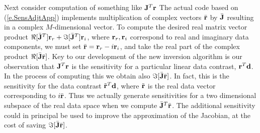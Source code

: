 Next consider computation of something like ${\bf J}^T {\bf r}$
The actual code based on (\ref{e.SensAdjtApp})
implements multiplication of complex vectors
$\bar {{\bf r}}$ by $\bar {{\bf J}}$ resulting in
a complex $M$-dimensional vector.
To compute the desired real matrix vector product
$\Re [\bar {{\bf J}}^T] {\bf r}_r + \Im [\bar {{\bf J}}^T] {\bf r}_i$, where
${\bf r}_r, {\bf r}_i$ correspond to real and imaginary data components,
we must set $\bar {{\bf r}} = {\bf r}_r - i {\bf r}_i$,
and take the real part of the complex product $\Re [\bar {{\bf J}} \bar {{\bf r}}]$.
Key to our development of the new inversion algorithm is our
observation that ${\bf J}^T {\bf r}$ is the sensitivity for a particular
linear data contrast, ${\bf r}^T{\bf d}$.  In the process of computing
this we obtain also $\Im [\bar {{\bf J}} \bar {{\bf r}}]$. In fact, this is
the sensitivity for the data contrast  $\tilde {{\bf r}}^T{\bf d}$,
where $\tilde {{\bf r}}$ is the real data vector corresponding to
$i\bar {{\bf r}}$. Thus we actually generate sensitivities for
a two dimensional subspace of the real data space when
we compute $\bar {{\bf J}}^T\bar {{\bf r}}$.
The additional sensitivity could in principal be used to
improve the approximation of the Jacobian, at the cost of saving
$\Im [\bar {{\bf J}} \bar {{\bf r}}]$.
